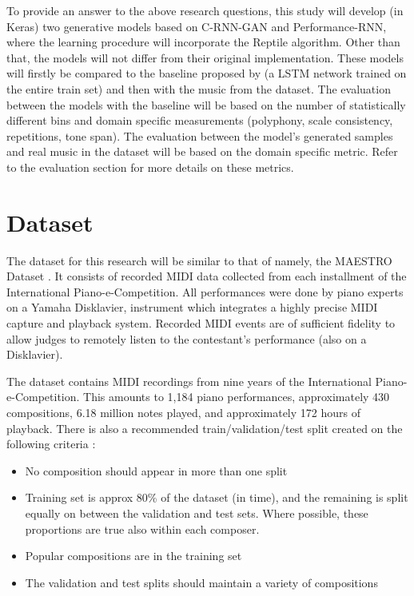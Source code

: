\documentclass[a4paper]{book}
\begin{document}
To provide an answer to the above research questions, this study will develop (in Keras) two generative models based on C-RNN-GAN and Performance-RNN, where the learning procedure will incorporate the Reptile algorithm. Other than that, the models will not differ from their original implementation. These models will firstly be compared to the baseline proposed by \textcite{larochelle_few-shot_2017} (a LSTM network trained on the entire train set) and then with the music from the dataset. The evaluation between the models with the baseline will be based on the number of statistically different bins \parencite[NDB;][]{richardson_gans_2018} and domain specific measurements (polyphony, scale consistency, repetitions, tone span). The evaluation between the model's generated samples and real music in the dataset will be based on the domain specific metric. Refer to the evaluation section for more details on these metrics.

\section{Dataset}

The dataset for this research will be similar to that of \parencite{oore_this_2018} namely, the MAESTRO Dataset \parencite{hawthorne_enabling_2018}. It consists of recorded MIDI data collected from each installment of the International Piano-e-Competition. All performances were done by piano experts on a Yamaha Disklavier, instrument which integrates a highly precise MIDI capture and playback system. Recorded MIDI events are of sufficient fidelity to allow judges to remotely listen to the contestant's performance (also on a Disklavier).

The dataset contains MIDI recordings from nine years of the International Piano-e-Competition. This amounts to 1,184 piano performances, approximately 430 compositions, 6.18 million notes played, and approximately 172 hours of playback. There is also a recommended train/validation/test split created on the following criteria \parencite{hawthorne_enabling_2018}:

\begin{itemize}
    \item No composition should appear in more than one split
    \item Training set is approx 80\% of the dataset (in time), and the remaining is split equally on between the validation and test sets. Where possible, these proportions are true also within each composer.
    \item Popular compositions are in the training set
    \item The validation and test splits should maintain a variety of compositions
\end{itemize}
\end{document}
